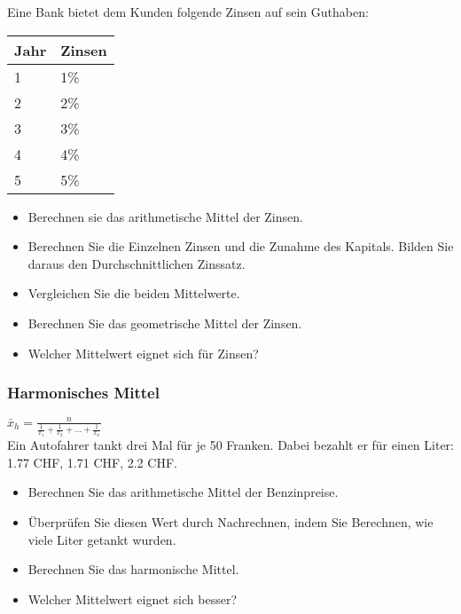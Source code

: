\documentclass[11pt, twocolumn, a4paper]{scrartcl}
\begin{document}
Eine Bank bietet dem Kunden folgende Zinsen auf sein Guthaben:

\begin{tabular}{p{4cm}p{4cm}}
\toprule
\textbf{Jahr} & \textbf{Zinsen} \\
\midrule
1& 1\%\\
\midrule
2& 2\%\\
\midrule
3& 3\%\\
\midrule
4& 4\%\\
\midrule
5& 5\%\\
\bottomrule
\end{tabular}

\begin{itemize}
\item Berechnen sie das arithmetische Mittel der Zinsen.
\item Berechnen Sie die Einzelnen Zinsen und die Zunahme des Kapitals. Bilden Sie daraus den Durchschnittlichen Zinssatz.
\item Vergleichen Sie die beiden Mittelwerte.
\item Berechnen Sie das geometrische Mittel der Zinsen.
\item Welcher Mittelwert eignet sich für Zinsen?
\end{itemize}

\subsubsection{Harmonisches Mittel}
$\bar{x}_h=\frac{n}{\frac{1}{x_1}+\frac{1}{x_2}+\ldots + \frac{1}{x_n}}$\\

Ein Autofahrer tankt drei Mal für je 50 Franken. Dabei bezahlt er für einen Liter: 1.77 CHF, 1.71 CHF, 2.2 CHF.

\begin{itemize}
\item Berechnen Sie das arithmetische Mittel der Benzinpreise.
\item Überprüfen Sie diesen Wert durch Nachrechnen, indem Sie Berechnen, wie viele Liter getankt wurden.
\item Berechnen Sie das harmonische Mittel.
\item Welcher Mittelwert eignet sich besser?
\end{itemize}


\end{document}
